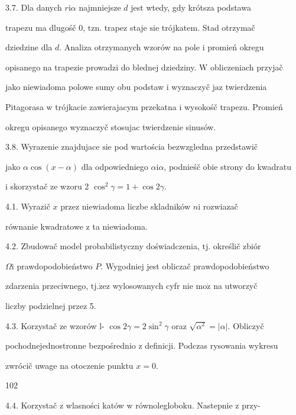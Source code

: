 \documentclass[a4paper,12pt]{article}
\begin{document}
3.7. Dla danych $ r\mathrm{i}\alpha$ najmniejsze $d$ jest wtedy, gdy krótsza podstawa

trapezu ma dlugośč 0, $\mathrm{t}\mathrm{z}\mathrm{n}$. trapez staje $\mathrm{s}\mathrm{i}\mathrm{e}$ trójkatem. Stad otrzymač

dziedzine dla $d$. Analiza otrzymanych wzorów na pole $\mathrm{i}$ promień okregu

opisanego na trapezie prowadzi do blednej dziedziny. $\mathrm{W}$ obliczeniach przyjač

jako niewiadoma polowe sumy obu podstaw $\mathrm{i}$ wyznaczyč $\mathrm{j}\mathrm{a}\mathrm{z}$ twierdzenia

Pitagorasa $\mathrm{w}$ trójkacie zawierajacym przekatna $\mathrm{i}$ wysokośč trapezu. Promień

okregu opisanego wyznaczyč stosujac twierdzenie sinusów.

3.8. Wyrazenie znajdujace $\mathrm{s}\mathrm{i}\mathrm{e}$ pod wartościa bezwzgledna przedstawič

jako $\alpha\cos(x-\alpha)$ dla odpowiedniego $\alpha \mathrm{i}\alpha$, podnieśč obie strony do kwadratu

$\mathrm{i}$ skorzystač ze wzoru 2 $\cos^{2}\gamma=1+\cos 2\gamma.$

4.1. Wyrazič $x$ przez niewiadoma liczbe skladników $n \mathrm{i}$ rozwiazač

równanie kwadratowe $\mathrm{z}$ ta niewiadoma.

4.2. Zbudowač model probabilistyczny doświadczenia, $\mathrm{t}\mathrm{j}$. określič zbiór

$\Omega \mathrm{i}$ prawdopodobieństwo $P$. Wygodniej jest obliczač prawdopodobieństwo

zdarzenia przeciwnego, $\mathrm{t}\mathrm{j}. \dot{\mathrm{z}}\mathrm{e} \mathrm{z}$ wylosowanych cyfr nie $\mathrm{m}\mathrm{o}\dot{\mathrm{z}}$ na utworzyč

liczby podzielnej przez 5.

4.3. Korzystač ze wzorów l- $\cos 2\gamma=2\sin^{2}\gamma$ oraz $\sqrt{\alpha^{2}}=|\alpha|$. Obliczyč

pochodnejednostronne bezpośrednio $\mathrm{z}$ definicji. Podczas rysowania wykresu

zwrócič uwage na otoczenie punktu $x=0.$





102

4.4. Korzystač $\mathrm{z}$ wlasności katów $\mathrm{w}$ równolegloboku. Nastepnie $\mathrm{z}$ przy-
\end{document}
